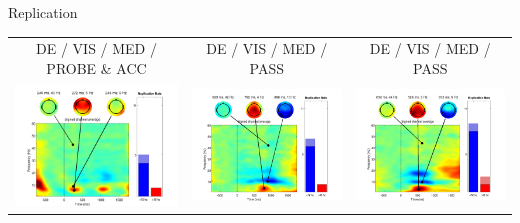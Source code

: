 \documentclass[final]{beamer}
\begin{document}
\begin{frame}{}
\begin{textblock}{63}
\begin{block}{Replication}
\begin{tabular}{c c c}
DE / VIS / MED / PROBE \& ACC  & DE / VIS / MED / PASS & DE / VIS / MED / PASS \\
\includegraphics{gamma07} & \includegraphics{gamma08} & \includegraphics{gamma09} \\

\end{tabular}
\end{block}
\end{textblock}
\end{frame}
\end{document}
